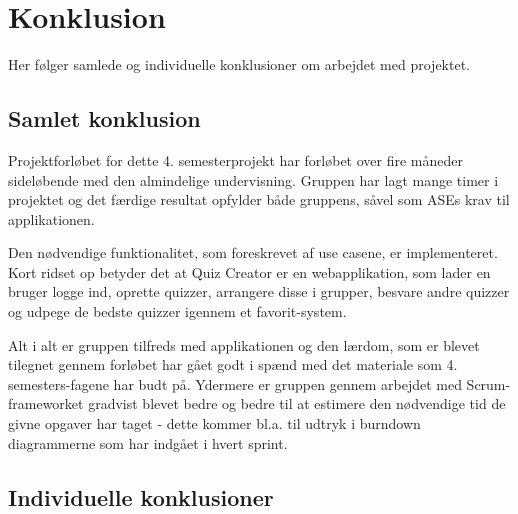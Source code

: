 \chapter{Konklusion}
Her følger samlede og individuelle konklusioner om arbejdet med projektet.

\section{Samlet konklusion}
Projektforløbet for dette 4. semesterprojekt har forløbet over fire måneder sideløbende med den almindelige undervisning. Gruppen har lagt mange timer i projektet og det færdige resultat opfylder både gruppens, såvel som ASEs krav til applikationen.

Den nødvendige funktionalitet, som foreskrevet af use casene, er implementeret. Kort ridset op betyder det at Quiz Creator er en webapplikation, som lader en bruger logge ind, oprette quizzer, arrangere disse i grupper, besvare andre quizzer og udpege de bedste quizzer igennem et favorit-system.

Alt i alt er gruppen tilfreds med applikationen og den lærdom, som er blevet tilegnet gennem forløbet har gået godt i spænd med det materiale som 4. semesters-fagene har budt på. Ydermere er gruppen gennem arbejdet med Scrum-frameworket gradvist blevet bedre og bedre til at estimere den nødvendige tid de givne opgaver har taget - dette kommer bl.a. til udtryk i burndown diagrammerne som har indgået i hvert sprint. 

\section{Individuelle konklusioner}









